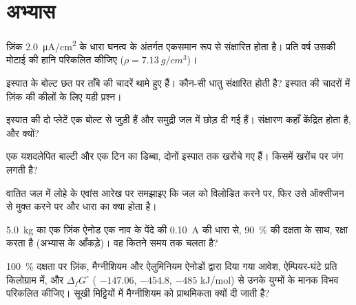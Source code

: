 \section{अभ्यास}

\begin{exercise}[$\star$]\label{exo:b2:corrosion:1}
ज़िंक \qty{2.0}{\micro A/cm^2} के धारा घनत्व के अंतर्गत एकसमान रूप से संक्षारित होता है।
प्रति वर्ष उसकी मोटाई की हानि परिकलित कीजिए ($\rho = \qty{7.13}{g/cm^3}$)।
\end{exercise}

\begin{exercise}[$\star$]\label{exo:b2:corrosion:2}
इस्पात के बोल्ट छत पर ताँबे की चादरें थामे हुए हैं। कौन-सी धातु संक्षारित होती है?
इस्पात की चादरों में ज़िंक की कीलों के लिए यही प्रश्न।
\end{exercise}

\begin{exercise}[$\star$]\label{exo:b2:corrosion:3}
इस्पात की दो प्लेटें एक बोल्ट से जुड़ी हैं और समुद्री जल में छोड़ दी गई हैं। संक्षारण कहाँ
केंद्रित होता है, और क्यों?
\end{exercise}

\begin{exercise}[$\star$]\label{exo:b2:corrosion:4}
एक यशदलेपित बाल्टी और एक टिन का डिब्बा, दोनों इस्पात तक खरोंचे गए हैं। किसमें
खरोंच पर जंग लगती है?
\end{exercise}

\begin{exercise}[$\star\star$]\label{exo:b2:corrosion:5}
वातित जल में लोहे के एवांस आरेख पर समझाइए कि जल को विलोडित करने पर, फिर
उसे ऑक्सीजन से मुक्त करने पर  और धारा का क्या होता है।
\end{exercise}

\begin{exercise}[$\star\star$]\label{exo:b2:corrosion:6}
\qty{5.0}{kg} का एक ज़िंक ऐनोड एक नाव के पेंदे की \qty{0.10}{A} की धारा से,
90~\% की दक्षता के साथ, रक्षा करता है (अभ्यास के आँकड़े)। वह कितने समय तक
चलता है?
\end{exercise}

\begin{exercise}[$\star\star$]\label{exo:b2:corrosion:7}
100~\% दक्षता पर ज़िंक, मैग्नीशियम और ऐलुमिनियम ऐनोडों द्वारा दिया गया आवेश, ऐम्पियर-घंटे
प्रति किलोग्राम में, और $\Delta_f G^\circ$ ( $-147.06$,  $-454.8$,
 $-485$ \unit{kJ/mol}) से उनके युग्मों के मानक विभव परिकलित कीजिए।
सूखी मिट्टियों में मैग्नीशियम को प्राथमिकता क्यों दी जाती है?
\end{exercise}


